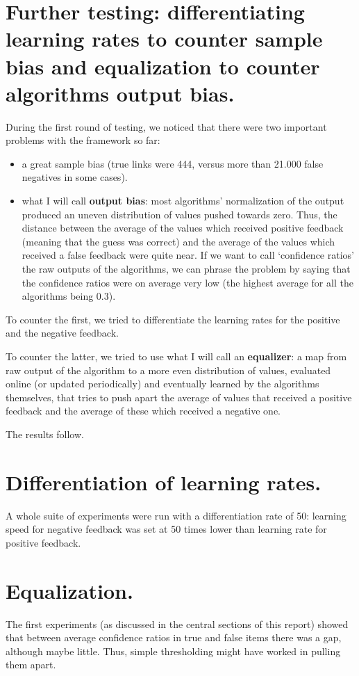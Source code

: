 \documentclass[11pt]{article}
\begin{document}
\section{Further testing: differentiating learning rates to counter sample bias and equalization to counter algorithms output bias.}

During the first round of testing, we noticed that there were two important problems with the framework so far:
\begin{itemize}
\item a great sample bias (true links were 444, versus more than 21.000 false negatives in some cases).
\item what I will call \textbf{output bias}: most algorithms' normalization of the output produced an uneven distribution of values pushed towards zero. Thus, the distance between the average of the values which received positive feedback (meaning that the guess was correct) and the average of the values which received a false feedback were quite near. If we want to call `confidence ratios' the raw outputs of the algorithms, we can phrase the problem by saying that the confidence ratios were on average very low (the highest average for all the algorithms being 0.3).
\end{itemize}

To counter the first, we tried to differentiate the learning rates for the positive and the negative feedback.

To counter the latter, we tried to use what I will call an \textbf{equalizer}: a map from raw output of the algorithm to a more even distribution of values, evaluated online (or updated periodically) and eventually learned by the algorithms themselves, that tries to push apart the average of values that received a positive feedback and the average of these which received a negative one.

The results follow.

\section{Differentiation of learning rates.}
A whole suite of experiments were run with a differentiation rate of 50: learning speed for negative feedback was set at 50 times lower than learning rate for positive feedback.

\section{Equalization.}
The first experiments (as discussed in the central sections of this report) showed that between average confidence ratios in true and false items there was a gap, although maybe little. Thus, simple thresholding might have worked in pulling them apart.
\end{document}

